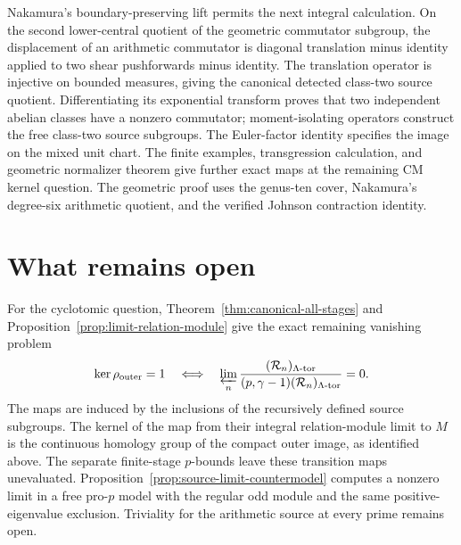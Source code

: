 \documentclass[11pt]{article}
\theoremstyle{definition}\newtheorem{definition}[theorem]{Definition}
\begin{document}
Nakamura's boundary-preserving lift permits the next integral calculation. On the second lower-central quotient of the geometric commutator subgroup, the displacement of an arithmetic commutator is diagonal translation minus identity applied to two shear pushforwards minus identity. The translation operator is injective on bounded measures, giving the canonical detected class-two source quotient. Differentiating its exponential transform proves that two independent abelian classes have a nonzero commutator; moment-isolating operators construct the free class-two source subgroups. The Euler-factor identity specifies the image on the mixed unit chart. The finite examples, transgression calculation, and geometric normalizer theorem give further exact maps at the remaining CM kernel question. The geometric proof uses the genus-ten cover, Nakamura's degree-six arithmetic quotient, and the verified Johnson contraction identity.



























\section{What remains open}

For the cyclotomic question, Theorem~\ref{thm:canonical-all-stages} and Proposition~\ref{prop:limit-relation-module} give the exact remaining vanishing problem
\[
 \ker\rho_{\mathrm{outer}}=1
 \quad\Longleftrightarrow\quad
 \varprojlim_n
 \frac{(\mathcal R_n)_{\Lambda\text{-tor}}}
      {(p,\gamma-1)(\mathcal R_n)_{\Lambda\text{-tor}}}=0.
\]
The maps are induced by the inclusions of the recursively defined source subgroups. The kernel of the map from their integral relation-module limit to $M$ is the continuous homology group of the compact outer image, as identified above. The separate finite-stage $p$-bounds leave these transition maps unevaluated. Proposition~\ref{prop:source-limit-countermodel} computes a nonzero limit in a free pro-$p$ model with the regular odd module and the same positive-eigenvalue exclusion. Triviality for the arithmetic source at every prime remains open.
\end{document}
